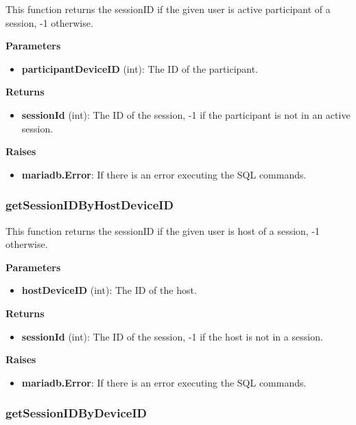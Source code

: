 \documentclass[oneside, ngerman]{sdqtechreport}
\begin{document}
This function returns the sessionID if the given user is active participant of a session, -1 otherwise.

\textbf{Parameters}

\begin{itemize}
    \item \textbf{participantDeviceID} (int): The ID of the participant.
\end{itemize}

\textbf{Returns}

\begin{itemize}
    \item \textbf{sessionId} (int): The ID of the session, -1 if the participant is not in an active session.
\end{itemize}

\textbf{Raises}

\begin{itemize}
    \item \textbf{mariadb.Error}: If there is an error executing the SQL commands.
\end{itemize}

\subsubsection{getSessionIDByHostDeviceID}

This function returns the sessionID if the given user is host of a session, -1 otherwise.

\textbf{Parameters}

\begin{itemize}
    \item \textbf{hostDeviceID} (int): The ID of the host.
\end{itemize}

\textbf{Returns}

\begin{itemize}
    \item \textbf{sessionId} (int): The ID of the session, -1 if the host is not in a session.
\end{itemize}

\textbf{Raises}

\begin{itemize}
    \item \textbf{mariadb.Error}: If there is an error executing the SQL commands.
\end{itemize}

\subsubsection{getSessionIDByDeviceID}
\end{document}
